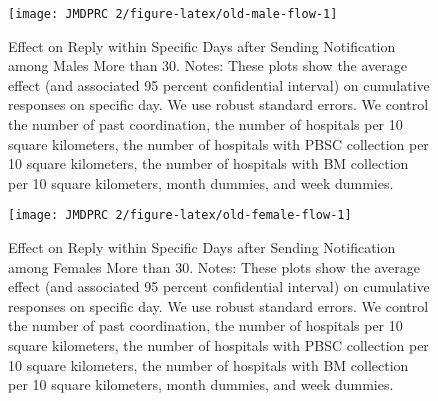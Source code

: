 \documentclass[12pt, a4paper]{article}
\begin{document}
\begin{figure}[H]
\texttt{[image: JMDPRC~2/figure-latex/old-male-flow-1]} \caption{Effect on Reply within Specific Days after Sending Notification among Males More than 30. Notes: These plots show the average effect (and associated 95 percent confidential interval) on cumulative responses on specific day. We use robust standard errors. We control the number of past coordination, the number of hospitals per 10 square kilometers, the number of hospitals with PBSC collection per 10 square kilometers, the number of hospitals with BM collection per 10 square kilometers, month dummies, and week dummies.}\label{fig:old-male-flow}
\end{figure}

\begin{figure}[H]
\texttt{[image: JMDPRC~2/figure-latex/old-female-flow-1]} \caption{Effect on Reply within Specific Days after Sending Notification among Females More than 30. Notes: These plots show the average effect (and associated 95 percent confidential interval) on cumulative responses on specific day. We use robust standard errors. We control the number of past coordination, the number of hospitals per 10 square kilometers, the number of hospitals with PBSC collection per 10 square kilometers, the number of hospitals with BM collection per 10 square kilometers, month dummies, and week dummies.}\label{fig:old-female-flow}
\end{figure}
\end{document}
